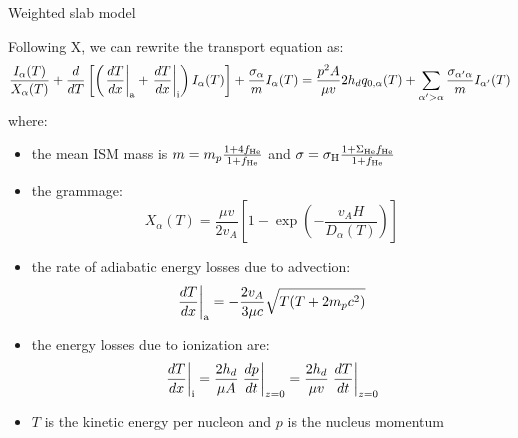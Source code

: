 \documentclass[9pt]{beamer}
\begin{document}
\begin{frame}{Weighted slab model}

Following X, we can rewrite the transport equation as:
%
\begin{equation*}
\frac{I_\alpha(T)}{X_\alpha(T)} + \frac{d}{dT} \left[ \left( \left.\frac{dT}{dx}\right|_{\rm a} + \left.\frac{dT}{dx}\right|_{\rm i} \right) I_\alpha(T) \right] + \frac{\sigma_\alpha}{m} I_\alpha(T) = 
\frac{p^2 A}{\mu v} 2h_d q_{0,\alpha}(T)
+ \sum_{\alpha'>\alpha} \frac{\sigma_{\alpha'\alpha}}{m} I_{\alpha'}(T)
\end{equation*}
%
where:

\begin{itemize}
\item the mean ISM mass is $m = m_p \frac{1+4f_{\rm He}}{1+f_{\rm He}}$ and $\sigma = \sigma_{\rm H} \frac{1+\Sigma_{\rm He}f_{\rm He}}{1+f_{\rm He}}$ 
\item the grammage: 
\begin{equation*}
X_\alpha (T) = \frac{\mu v}{2 v_A}
\left[1-\exp\left(-\frac{v_A H}{D_\alpha(T)}\right)\right]
\end{equation*}

\item the rate of adiabatic energy losses due to advection:
\begin{equation*}
\left.\frac{dT}{dx}\right|_{\rm a} = -\frac{2v_A}{3\mu c} \sqrt{T(T+2m_pc^2)}
\end{equation*}

\item the energy losses due to ionization are:
\begin{equation*}
\left.\frac{dT}{dx}\right|_{\rm i} = \frac{2h_d}{\mu A} \left.\frac{dp}{dt}\right|_{z=0} = \frac{2h_d}{\mu v} \left.\frac{dT}{dt}\right|_{z=0}
\end{equation*}

\item {\color{orange}$T$ is the kinetic energy per nucleon and $p$ is the nucleus momentum}
\end{itemize}

\end{frame}
\end{document}
